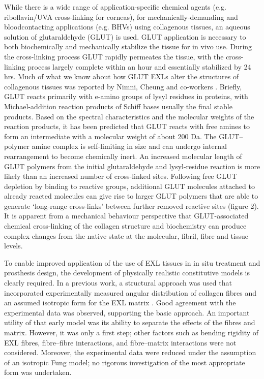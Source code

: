     While there is a wide range of application-specific chemical agents (e.g. riboflavin/UVA cross-linking for corneas), for mechanically-demanding and blood\Hyphdash contacting applications (e.g. BHVs) using collagenous tissues, an aqueous solution of glutaraldehyde (GLUT) is used. GLUT application is necessary to both biochemically and mechanically stabilize the tissue for in vivo use. During the cross-linking process GLUT rapidly permeates the tissue, with the cross-linking process largely complete within an hour and essentially stabilized by 24 hrs. Much of what we know about how GLUT EXLs alter the structures of collagenous tissues was reported by Nimni, Cheung and co-workers \cite{cheung_mechanism_1990}\cite{nimni_chemically_1987}\cite{cheung_mechanism_1985}\cite{gendler_toxic_1984}\cite{cheung_presence_1983}\cite{cheung_mechanism_1982}\cite{cheung_mechanism_1982II}. Briefly, GLUT reacts primarily with e-amino groups of lysyl residues in proteins, with Michael-addition reaction products of Schiff bases usually the final stable products. Based on the spectral characteristics and the molecular weights of the reaction products, it has been predicted that GLUT reacts with free amines to form an intermediate with a molecular weight of about 200 Da. The GLUT–polymer amine complex is self-limiting in size and can undergo internal rearrangement to become chemically inert. An increased molecular length of GLUT polymers from the initial glutaraldehyde and lysyl-residue reaction is more likely than an increased number of cross-linked sites. Following free GLUT depletion by binding to reactive groups, additional GLUT molecules attached to already reacted molecules can give rise to larger GLUT polymers that are able to generate ‘long-range cross-links’ between further removed reactive sites (figure 2). It is apparent from a mechanical behaviour perspective that GLUT-associated chemical cross-linking of the collagen structure and biochemistry can produce complex changes from the native state at the molecular, fibril, fibre and tissue levels.
    
    
    To enable improved application of the use of EXL tissues in in situ treatment and prosthesis design, the development of physically realistic constitutive models is clearly required. In a previous work, a structural approach was used that incorporated experimentally measured angular distribution of collagen fibres and an assumed isotropic form for the EXL matrix \cite{sacks_structural_2000}. Good agreement with the experimental data was observed, supporting the basic approach. An important utility of that early model was its ability to separate the effects of the fibres and matrix. However, it was only a first step; other factors such as bending rigidity of EXL fibres, fibre–fibre interactions, and fibre–matrix interactions were not considered. Moreover, the experimental data were reduced under the assumption of an isotropic Fung model; no rigorous investigation of the most appropriate form was undertaken.
    
